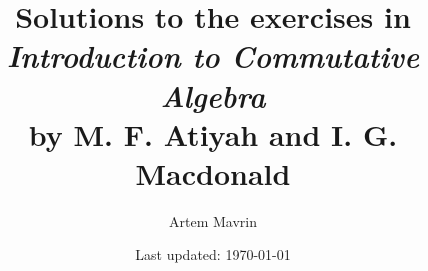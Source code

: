 \documentclass{solutions}
\title{\texorpdfstring{%
Solutions to the exercises in\\
\emph{Introduction to Commutative Algebra}\\
by M. F. Atiyah and I. G. Macdonald}%
{Atiyah-Macdonald Solutions}}
\author{Artem Mavrin}
\date{Last updated: \today}
\begin{document}
\frontmatter
\maketitle
\tableofcontents

\mainmatter

\GenerateSolutions

\backmatter

\nocite{AtiyahMacDonald}
\printbibliography[heading=bibintoc]
\end{document}
